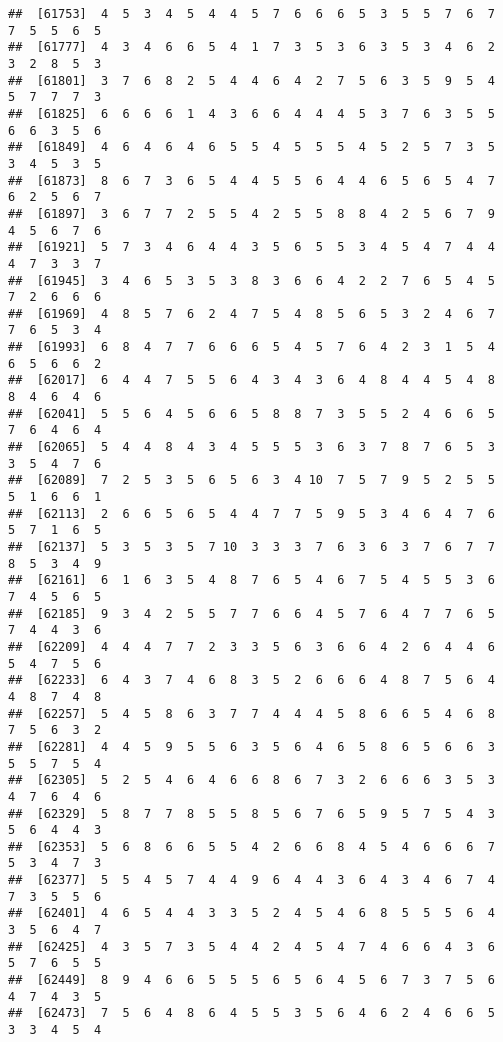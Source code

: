 \documentclass[
]{book}
\begin{document}
\begin{verbatim}
##  [61753]  4  5  3  4  5  4  4  5  7  6  6  6  5  3  5  5  7  6  7  7  5  5  6  5
##  [61777]  4  3  4  6  6  5  4  1  7  3  5  3  6  3  5  3  4  6  2  3  2  8  5  3
##  [61801]  3  7  6  8  2  5  4  4  6  4  2  7  5  6  3  5  9  5  4  5  7  7  7  3
##  [61825]  6  6  6  6  1  4  3  6  6  4  4  4  5  3  7  6  3  5  5  6  6  3  5  6
##  [61849]  4  6  4  6  4  6  5  5  4  5  5  5  4  5  2  5  7  3  5  3  4  5  3  5
##  [61873]  8  6  7  3  6  5  4  4  5  5  6  4  4  6  5  6  5  4  7  6  2  5  6  7
##  [61897]  3  6  7  7  2  5  5  4  2  5  5  8  8  4  2  5  6  7  9  4  5  6  7  6
##  [61921]  5  7  3  4  6  4  4  3  5  6  5  5  3  4  5  4  7  4  4  4  7  3  3  7
##  [61945]  3  4  6  5  3  5  3  8  3  6  6  4  2  2  7  6  5  4  5  7  2  6  6  6
##  [61969]  4  8  5  7  6  2  4  7  5  4  8  5  6  5  3  2  4  6  7  7  6  5  3  4
##  [61993]  6  8  4  7  7  6  6  6  5  4  5  7  6  4  2  3  1  5  4  6  5  6  6  2
##  [62017]  6  4  4  7  5  5  6  4  3  4  3  6  4  8  4  4  5  4  8  8  4  6  4  6
##  [62041]  5  5  6  4  5  6  6  5  8  8  7  3  5  5  2  4  6  6  5  7  6  4  6  4
##  [62065]  5  4  4  8  4  3  4  5  5  5  3  6  3  7  8  7  6  5  3  3  5  4  7  6
##  [62089]  7  2  5  3  5  6  5  6  3  4 10  7  5  7  9  5  2  5  5  5  1  6  6  1
##  [62113]  2  6  6  5  6  5  4  4  7  7  5  9  5  3  4  6  4  7  6  5  7  1  6  5
##  [62137]  5  3  5  3  5  7 10  3  3  3  7  6  3  6  3  7  6  7  7  8  5  3  4  9
##  [62161]  6  1  6  3  5  4  8  7  6  5  4  6  7  5  4  5  5  3  6  7  4  5  6  5
##  [62185]  9  3  4  2  5  5  7  7  6  6  4  5  7  6  4  7  7  6  5  7  4  4  3  6
##  [62209]  4  4  4  7  7  2  3  3  5  6  3  6  6  4  2  6  4  4  6  5  4  7  5  6
##  [62233]  6  4  3  7  4  6  8  3  5  2  6  6  6  4  8  7  5  6  4  4  8  7  4  8
##  [62257]  5  4  5  8  6  3  7  7  4  4  4  5  8  6  6  5  4  6  8  7  5  6  3  2
##  [62281]  4  4  5  9  5  5  6  3  5  6  4  6  5  8  6  5  6  6  3  5  5  7  5  4
##  [62305]  5  2  5  4  6  4  6  6  8  6  7  3  2  6  6  6  3  5  3  4  7  6  4  6
##  [62329]  5  8  7  7  8  5  5  8  5  6  7  6  5  9  5  7  5  4  3  5  6  4  4  3
##  [62353]  5  6  8  6  6  5  5  4  2  6  6  8  4  5  4  6  6  6  7  5  3  4  7  3
##  [62377]  5  5  4  5  7  4  4  9  6  4  4  3  6  4  3  4  6  7  4  7  3  5  5  6
##  [62401]  4  6  5  4  4  3  3  5  2  4  5  4  6  8  5  5  5  6  4  3  5  6  4  7
##  [62425]  4  3  5  7  3  5  4  4  2  4  5  4  7  4  6  6  4  3  6  5  7  6  5  5
##  [62449]  8  9  4  6  6  5  5  5  6  5  6  4  5  6  7  3  7  5  6  4  7  4  3  5
##  [62473]  7  5  6  4  8  6  4  5  5  3  5  6  4  6  2  4  6  6  5  3  3  4  5  4

\end{verbatim}
\end{document}
